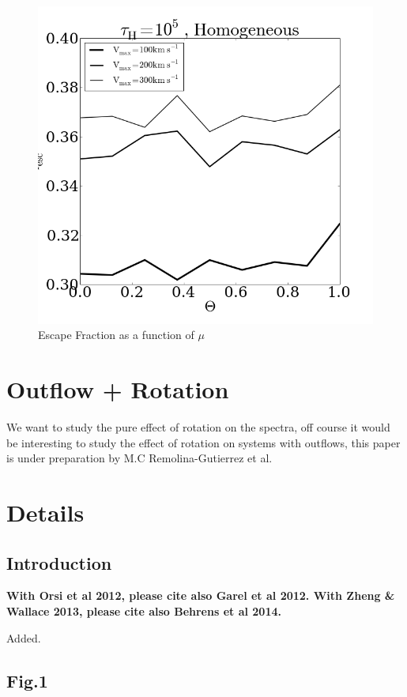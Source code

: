 \documentclass[12pt]{article}
\begin{document}
\begin{figure}
\includegraphics[scale=0.5]{escapefractionvstheta.png}
\caption{Escape Fraction as a function of $\mu$}
\end{figure}


\section*{Outflow + Rotation}

We want to study the pure effect of rotation on the spectra, off course it would
be interesting to study the effect of rotation on systems with
outflows, this paper is under preparation by M.C Remolina-Gutierrez et
al.   

\section*{Details}

\subsection*{Introduction}

{\bf With Orsi et al 2012, please cite also Garel et al 2012. With Zheng \& Wallace 2013, please cite also Behrens et al 2014.}

Added.

\subsection*{Fig.1}
\end{document}
